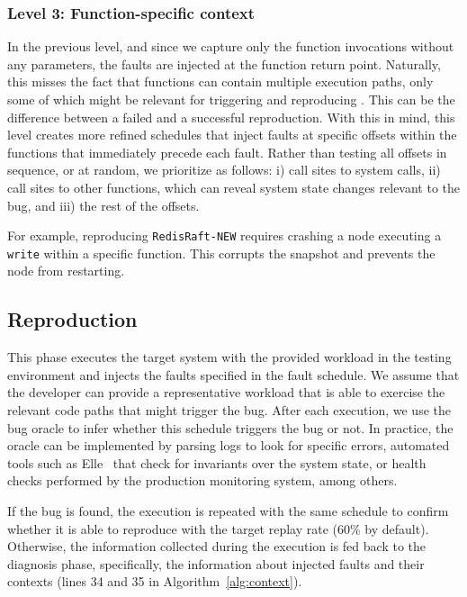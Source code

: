 \subsubsection{Level 3: Function-specific context}
\label{sec:levelthree}
In the previous level, and since we capture only the function invocations without any parameters, the faults are injected at the function return point.
Naturally, this misses the fact that functions can contain multiple execution paths, only some of which might be relevant for triggering and reproducing \efibshort.
This can be the difference between a failed and a successful reproduction.
With this in mind, this level creates more refined schedules that inject faults at specific offsets within the functions that immediately precede each fault.
Rather than testing all offsets in sequence, or at random, we prioritize as follows:
i) call sites to system calls,
ii) call sites to other functions, which can reveal system state changes relevant to the bug, and
iii) the rest of the offsets.

For example, reproducing \texttt{RedisRaft-NEW} requires crashing a node executing a \texttt{write} within a specific function.
This corrupts the snapshot and prevents the node from restarting.

\subsection{Reproduction}
\label{sec:reproducing}

This phase executes the target system with the provided workload in the testing environment and injects the faults specified in the fault schedule.
We assume that the developer can provide a representative workload that is able to exercise the relevant code paths that might trigger the bug.
After each execution, we use the bug oracle to infer whether this schedule triggers the bug or not.
In practice, the oracle can be implemented by parsing logs to look for specific errors, automated tools such as Elle~\cite{elle} that check for invariants over the system state, or health checks performed by the production monitoring system, among others.


If the bug is found, the execution is repeated with the same schedule to confirm whether it is able to reproduce with the target replay rate (60\% by default).
Otherwise, the information collected during the execution is fed back to the diagnosis phase, specifically, the information about injected faults and their contexts (lines 34 and 35 in Algorithm~\ref{alg:context}).


